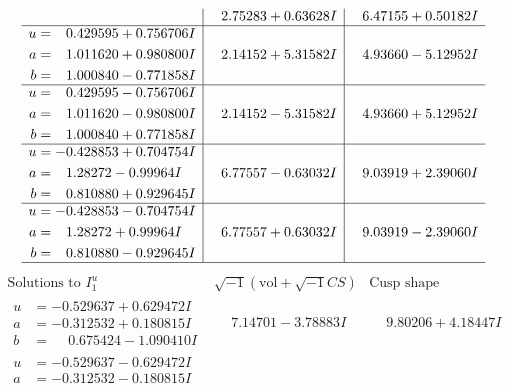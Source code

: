 \documentclass[1p]{elsarticle_modified}
\theoremstyle{definition}
\newcommand{\I}{\sqrt{-1}}
\begin{document}
$$\begin{array}{c|c|c}
 & \phantom{-}2.75283 + 0.63628 I & \phantom{-}6.47155 + 0.50182 I \\ \hline\begin{aligned}
u &= \phantom{-}0.429595 + 0.756706 I \\
a &= \phantom{-}1.011620 + 0.980800 I \\
b &= \phantom{-}1.000840 - 0.771858 I\end{aligned}
 & \phantom{-}2.14152 + 5.31582 I & \phantom{-}4.93660 - 5.12952 I \\ \hline\begin{aligned}
u &= \phantom{-}0.429595 - 0.756706 I \\
a &= \phantom{-}1.011620 - 0.980800 I \\
b &= \phantom{-}1.000840 + 0.771858 I\end{aligned}
 & \phantom{-}2.14152 - 5.31582 I & \phantom{-}4.93660 + 5.12952 I \\ \hline\begin{aligned}
u &= -0.428853 + 0.704754 I \\
a &= \phantom{-}1.28272 - 0.99964 I \\
b &= \phantom{-}0.810880 + 0.929645 I\end{aligned}
 & \phantom{-}6.77557 - 0.63032 I & \phantom{-}9.03919 + 2.39060 I \\ \hline\begin{aligned}
u &= -0.428853 - 0.704754 I \\
a &= \phantom{-}1.28272 + 0.99964 I \\
b &= \phantom{-}0.810880 - 0.929645 I\end{aligned}
 & \phantom{-}6.77557 + 0.63032 I & \phantom{-}9.03919 - 2.39060 I\\
 \hline 
 \end{array}$$\newpage$$\begin{array}{c|c|c}  
\text{Solutions to }I^u_{1}& \I (\text{vol} + \sqrt{-1}CS) & \text{Cusp shape}\\
 \hline 
\begin{aligned}
u &= -0.529637 + 0.629472 I \\
a &= -0.312532 + 0.180815 I \\
b &= \phantom{-}0.675424 - 1.090410 I\end{aligned}
 & \phantom{-}7.14701 - 3.78883 I & \phantom{-}9.80206 + 4.18447 I \\ \hline\begin{aligned}
u &= -0.529637 - 0.629472 I \\
a &= -0.312532 - 0.180815 I \\

\end{aligned}
\end{array}$$
\end{document}
